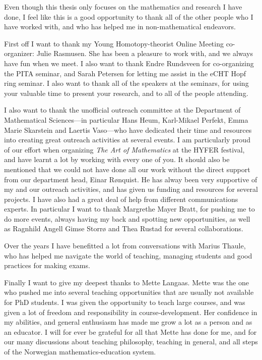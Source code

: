 Even though this thesis only focuses on the mathematics and research I have done, I feel like this is a good opportunity to thank all of the other people who I have worked with, and who has helped me in non-mathematical endeavors. 

First off I want to thank my Young Homotopy-theorist Online Meeting co-organizer: Julie Rasmusen. She has been a pleasure to work with, and we always have fun when we meet. I also want to thank Endre Rundsveen for co-organizing the PITA seminar, and Sarah Petersen for letting me assist in the eCHT Hopf ring seminar. I also want to thank all of the speakers at the seminars, for using your valuable time to present your research, and to all of the people attending. 

I also want to thank the unofficial outreach committee at the Department of Mathematical Sciences---in particular Hans Heum, Karl-Mikael Perfekt, Emma Marie Skarstein and Laertis Vaso---who have dedicated their time and resources into creating great outreach activities at several events. I am particularly proud of our effort when organizing \emph{The Art of Mathematics} at the HYFER festival, and have learnt a lot by working with every one of you. It should also be mentioned that we could not have done all our work without the direct support from our department head, Einar Rønquist. He has alway been very supportive of my and our outreach activities, and has given us funding and resources for several projects. I have also had a great deal of help from different communications experts. In particular I want to thank Margrethe Mayer Bratt, for pushing me to do more events, always having my back and spotting new opportunities, as well as Ragnhild Angell Gimse Storrø and Thea Rustad for several collaborations. 

Over the years I have benefitted a lot from conversations with Marius Thaule, who has helped me navigate the world of teaching, managing students and good practices for making exams. 

Finally I want to give my deepest thanks to Mette Langaas. Mette was the one who pushed me into several teaching opportunities that are usually not available for PhD students. I was given the opportunity to teach large courses, and was given a lot of freedom and responsibility in course-development. Her confidence in my abilities, and general enthusiasm has made me grow a lot as a person and as an educator. I will for ever be grateful for all that Mette has done for me, and for our many discussions about teaching philosophy, teaching in general, and all steps of the Norwegian mathematics-education system.  

